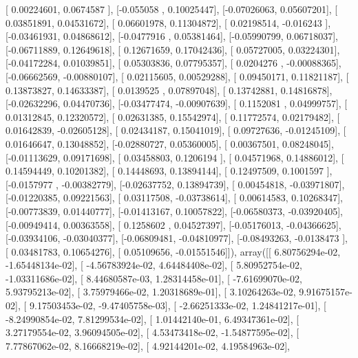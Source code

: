 \documentclass{article}
\begin{document}
       [ 0.00224601,  0.0674587 ],
       [-0.055058  ,  0.10025447],
       [-0.07026063,  0.05607201],
       [ 0.03851891,  0.04531672],
       [ 0.06601978,  0.11304872],
       [ 0.02198514, -0.016243  ],
       [-0.03461931,  0.04868612],
       [-0.0477916 ,  0.05381464],
       [-0.05990799,  0.06718037],
       [-0.06711889,  0.12649618],
       [ 0.12671659,  0.17042436],
       [ 0.05727005,  0.03224301],
       [-0.04172284,  0.01039851],
       [ 0.05303836,  0.07795357],
       [ 0.0204276 , -0.00088365],
       [-0.06662569, -0.00880107],
       [ 0.02115605,  0.00529288],
       [ 0.09450171,  0.11821187],
       [ 0.13873827,  0.14633387],
       [ 0.0139525 ,  0.07897048],
       [ 0.13742881,  0.14816878],
       [-0.02632296,  0.04470736],
       [-0.03477474, -0.00907639],
       [ 0.1152081 ,  0.04999757],
       [ 0.01312845,  0.12320572],
       [ 0.02631385,  0.15542974],
       [ 0.11772574,  0.02179482],
       [ 0.01642839, -0.02605128],
       [ 0.02434187,  0.15041019],
       [ 0.09727636, -0.01245109],
       [ 0.01646647,  0.13048852],
       [-0.02880727,  0.05360005],
       [ 0.00367501,  0.08248045],
       [-0.01113629,  0.09171698],
       [ 0.03458803,  0.1206194 ],
       [ 0.04571968,  0.14886012],
       [ 0.14594449,  0.10201382],
       [ 0.14448693,  0.13894144],
       [ 0.12497509,  0.1001597 ],
       [-0.0157977 , -0.00382779],
       [-0.02637752,  0.13894739],
       [ 0.00454818, -0.03971807],
       [-0.01220385,  0.09221563],
       [ 0.03117508, -0.03738614],
       [ 0.00614583,  0.10268347],
       [-0.00773839,  0.01440777],
       [-0.01413167,  0.10057822],
       [-0.06580373, -0.03920405],
       [-0.00949414,  0.00363558],
       [ 0.1258602 ,  0.04527397],
       [-0.05176013, -0.04366625],
       [-0.03934106, -0.03040377],
       [-0.06809481, -0.04810977],
       [-0.08493263, -0.0138473 ],
       [ 0.03481783,  0.10654276],
       [ 0.05109656, -0.01551546]]), array([[  6.80756294e-02,  -1.65448134e-02],
       [ -4.56783924e-02,   4.64484408e-02],
       [  5.80952754e-02,  -1.03311686e-02],
       [  8.44680587e-03,   1.28314458e-01],
       [ -7.61699070e-02,   5.93795213e-02],
       [  3.75979466e-02,   1.20318689e-01],
       [  3.10264263e-02,   9.91675157e-02],
       [  9.17503453e-02,  -9.47405758e-03],
       [ -2.66251333e-02,   1.24841217e-01],
       [ -8.24990854e-02,   7.81299534e-02],
       [  1.01442140e-01,   6.49347361e-02],
       [  3.27179554e-02,   3.96094505e-02],
       [  4.53473418e-02,  -1.54877595e-02],
       [  7.77867062e-02,   8.16668219e-02],
       [  4.92144201e-02,   4.19584963e-02],
\end{document}
